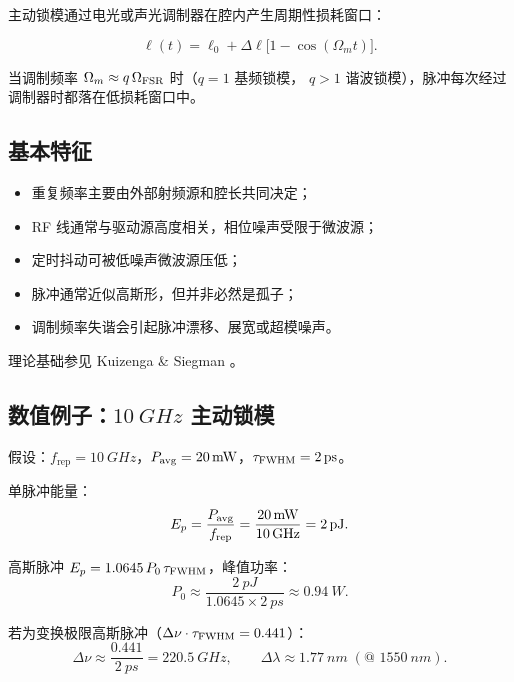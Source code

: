 \documentclass[11pt,a4paper]{article}
\newcommand{\rep}{f_{\text{rep}}}
\begin{document}
主动锁模通过电光或声光调制器在腔内产生周期性损耗窗口：

\begin{equation}\label{eq:am_modulation}
\ell(t) = \ell_0 + \Delta\ell\big[1 - \cos(\Omega_m t)\big].
\end{equation}

当调制频率 $\Omega_m \approx q\,\Omega_{\rm FSR}$ 时（$q=1$ 基频锁模，
$q>1$ 谐波锁模），脉冲每次经过调制器时都落在低损耗窗口中。

\subsection{基本特征}

\begin{itemize}
    \item 重复频率主要由外部射频源和腔长共同决定；
    \item RF 线通常与驱动源高度相关，相位噪声受限于微波源；
    \item 定时抖动可被低噪声微波源压低；
    \item 脉冲通常近似高斯形，但并非必然是孤子；
    \item 调制频率失谐会引起脉冲漂移、展宽或超模噪声。
\end{itemize}

理论基础参见 Kuizenga \& Siegman \cite{Kuizenga1970}。

\subsection{数值例子：$\SI{10}{GHz}$ 主动锁模}

假设：$\rep = \SI{10}{GHz}$，$P_{\rm avg} = \SI{20}{mW}$，$\tau_{\rm FWHM} = \SI{2}{ps}$。

单脉冲能量：
\begin{equation}\label{eq:am_example_energy}
E_p = \frac{P_{\rm avg}}{\rep} = \frac{\SI{20}{mW}}{\SI{10}{GHz}} = \SI{2}{pJ}.
\end{equation}

高斯脉冲 $E_p = 1.0645\,P_0\,\tau_{\rm FWHM}$，峰值功率：
\begin{equation}\label{eq:am_example_peak}
P_0 \approx \frac{\SI{2}{pJ}}{1.0645 \times \SI{2}{ps}} \approx \SI{0.94}{W}.
\end{equation}

若为变换极限高斯脉冲（$\Delta\nu \cdot \tau_{\rm FWHM} = 0.441$）：
\begin{equation}\label{eq:am_example_spectrum}
\Delta\nu \approx \frac{0.441}{\SI{2}{ps}} = \SI{220.5}{GHz},
\qquad
\Delta\lambda \approx \SI{1.77}{nm}\;(\text{@ }\SI{1550}{nm}).
\end{equation}
\end{document}
